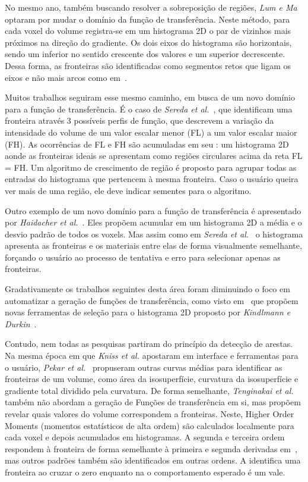 	No mesmo ano, também buscando resolver a sobreposição de regiões, \textit{Lum e Ma}~\cite{lumema} optaram por mudar o domínio da função de transferência. Neste método, para cada voxel do volume registra-se em um histograma 2D o par de vizinhos mais próximos na direção do gradiente. Os dois eixos do histograma são horizontais, sendo um inferior no sentido crescente dos valores e um superior decrescente. Dessa forma, as fronteiras são identificadas como segmentos retos que ligam os eixos e não mais arcos como em~\cite{gordon}.
	
	Muitos trabalhos seguiram esse mesmo caminho, em busca de um novo domínio para a função de transferência. É o caso de \textit{Sereda et al.}~\cite{sereda1}, que identificam uma fronteira através 3 possíveis perfis de função, que descrevem a variação da intensidade do volume de um valor escalar menor (FL) a um valor escalar maior (FH). As ocorrências de FL e FH são acumuladas em seu : um histograma 2D aonde as fronteiras ideais se apresentam como regiões circulares acima da reta FL = FH. Um algoritmo de crescimento de região é proposto para agrupar todas as entradas do histograma que pertencem à mesma fronteira. Caso o usuário queira ver mais de uma região, ele deve indicar sementes para o algoritmo.
	
	Outro exemplo de um novo domínio para a função de transferência é apresentado por \textit{Haidacher et al.}~\cite{haidacher}. Eles propõem acumular em um histograma 2D a média e o desvio padrão de todos os voxels. Mas assim como em \textit{Sereda et al.}~\cite{sereda1} o histograma apresenta as fronteiras e os materiais entre elas de forma visualmente semelhante, forçando o usuário ao processo de tentativa e erro para selecionar apenas as fronteiras.
	
	Gradativamente os trabalhos seguintes desta área foram diminuindo o foco em automatizar a geração de funções de transferência, como visto em~\cite{zou, wang} que propõem novas ferramentas de seleção para o histograma 2D proposto por \textit{Kindlmann e Durkin}~\cite{gordon}.
	
	Contudo, nem todas as pesquisas partiram do princípio da detecção de arestas. Na mesma época em que \textit{Kniss et al.} apostaram em interface e ferramentas para o usuário, \textit{Pekar et al.}~\cite{pekar} propuseram outras curvas médias para identificar as fronteiras de um volume, como área da isosuperfície, curvatura da isosuperfície e gradiente total dividido pela curvatura. De forma semelhante, \textit{Tenginakai et al.}~\cite{salient} também não abordam a geração de Funções de transferência em si, mas propõem revelar quais valores do volume correspondem a fronteiras. Neste, Higher Order Moments (momentos estatísticos de alta ordem) são calculados localmente para cada voxel e depois acumulados em histogramas. A segunda e terceira ordem respondem à fronteira de forma semelhante à primeira e segunda derivadas em~\cite{gordon}, mas outros padrões também são identificados em outras ordens. A  identifica uma fronteira ao cruzar o zero enquanto na  o comportamento esperado é um vale.
	
